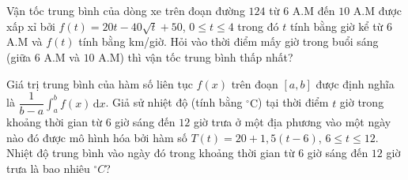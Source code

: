 \begin{bt}%
	Vận tốc trung bình của dòng xe trên đoạn đường $124$ từ $6$ A.M đến $10$ A.M  được xấp xỉ bởi $f(t) = 20t - 40\sqrt{t} + 50$, $0 \le t \le 4$ trong đó $t$ tính bằng giờ kể từ $6$ A.M và $f(t)$ tính bằng km/giờ. Hỏi vào thời điểm mấy giờ trong buổi sáng (giữa $6$ A.M và $10$ A.M) thì vận tốc trung bình thấp nhất?
\end{bt}

\begin{bt}%
	Giá trị trung bình của hàm số liên tục $f(x)$  trên đoạn $[a, b]$ được định nghĩa là
	$\dfrac{1}{b-a}  \displaystyle \int_{a}^{b} f(x) \mathrm{\,d}x$.
	Giả sử nhiệt độ (tính bằng $^{\circ}\mathrm{C}$) tại thời điểm $t$ giờ trong khoảng thời gian từ $6$ giờ sáng đến $12$ giờ trưa ở một địa phương vào một ngày nào đó được mô hình hóa bởi hàm số $T(t) = 20 + 1{,}5(t-6)$, $6 \le t \le 12$. Nhiệt độ trung bình vào ngày đó trong khoảng thời gian từ $6$ giờ sáng đến  $12$ giờ trưa là bao nhiêu $^\circ C$?
\end{bt}

